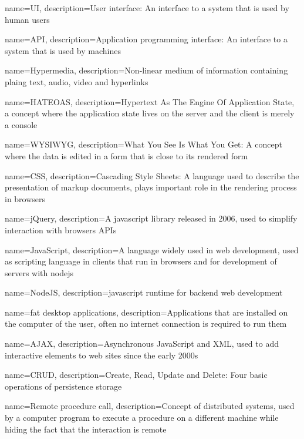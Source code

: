 {
    name={UI},
    description={User interface: An interface to a system that is used by human users}
}

{
    name={API},
    description={Application programming interface: An interface to a system that is used by machines}
}

{
    name={Hypermedia},
    description={Non-linear medium of information containing plaing text, audio, video and hyperlinks}
}

{
    name={HATEOAS},
    description={Hypertext As The Engine Of Application State, a concept where the application state lives on the server and the client is merely a console}
}

{
    name={WYSIWYG},
    description={What You See Is What You Get: A concept where the data is edited in a form that is close to its rendered form}
}

{
    name={CSS},
    description={Cascading Style Sheets: A language used to describe the presentation of markup documents, plays important role in the rendering process in browsers}
}

{
    name={jQuery},
    description={A \gls{javascript} library released in 2006, used to simplify interaction with browsers APIs}
}

{
    name={JavaScript},
    description={A language widely used in web development, used as scripting language in clients that run in browsers and for development of servers with \gls{nodejs}}
}

{
    name={NodeJS},
    description={\gls{javascript} runtime for backend web development}
}

{
    name={fat desktop applications},
    description={Applications that are installed on the computer of the user, often no internet connection is required to run them}
}

{
    name={AJAX},
    description={Asynchronous \gls{JavaScript} and XML, used to add interactive elements to web sites since the early 2000s}
}

{
    name={CRUD},
    description={Create, Read, Update and Delete: Four basic operations of persistence storage}
}

{
    name={Remote procedure call},
    description={Concept of distributed systems, used by a computer program to execute a procedure on a different machine while hiding the fact that the interaction is remote}
}

